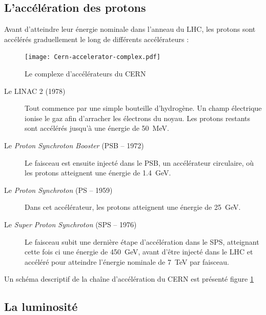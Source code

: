 \subsection{L'accélération des protons}
Avant d'atteindre leur énergie nominale dans l'anneau du LHC, les protons sont accélérés graduellement le long de différents accélérateurs :

\begin{figure} \centering
  \texttt{[image: Cern-accelerator-complex.pdf]}
  \caption{Le complexe d'accélérateurs du CERN}
  \label{fig:lhc_complex}
\end{figure}

\begin{description}
  \item[Le LINAC 2 (1978)] Tout commence par une simple bouteille d'hydrogène. Un champ électrique ionise le gaz afin d'arracher les électrons du noyau. Les protons restants sont accélérés jusqu'à une énergie de \SI{50}{\MeV}.
  \item[Le \emph{Proton Synchroton Booster} (PSB -- 1972)] Le faisceau est ensuite injecté dans le PSB, un accélérateur circulaire, où les protons atteignent une énergie de \SI{1.4}{\GeV}.
  \item[Le \emph{Proton Synchroton} (PS -- 1959)] Dans cet accélérateur, les protons atteignent une énergie de \SI{25}{GeV}.
  \item[Le \emph{Super Proton Synchroton} (SPS -- 1976)] Le faisceau subit une dernière étape d'accélération dans le SPS, atteignant cette fois ci une énergie de \SI{450}{\GeV}, avant d'être injecté dans le LHC et accéléré pour atteindre l'énergie nominale de \SI{7}{\TeV} par faisceau.
\end{description}

Un schéma descriptif de la chaîne d'accélération du CERN est présenté figure \ref{fig:lhc_complex}

\subsection{La luminosité}

